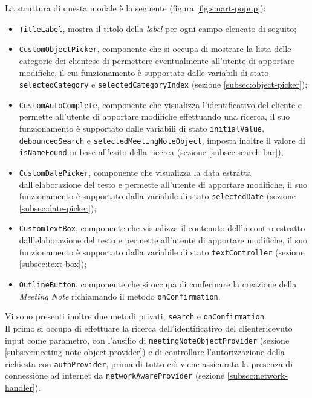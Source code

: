 La struttura di questa modale è la seguente (figura \ref{fig:smart-popup}):
\begin{itemize}
    \item \lstinline{TitleLabel}, mostra il titolo della \emph{label} per ogni campo elencato di seguito;
    \item \lstinline{CustomObjectPicker}, componente che si occupa di mostrare la lista delle categorie dei \glspl{cliente}\glsoccur e di permettere eventualmente all'utente di apportare modifiche, il cui funzionamento è supportato dalle variabili di stato \lstinline{selectedCategory} e \lstinline{selectedCategoryIndex} (sezione \ref{subsec:object-picker});
    \item \lstinline{CustomAutoComplete}, componente che visualizza l'identificativo del cliente e permette all'utente di apportare modifiche effettuando una ricerca, il suo funzionamento è supportato dalle variabili di stato \lstinline{initialValue}, \lstinline{debouncedSearch} e \lstinline{selectedMeetingNoteObject}, imposta inoltre il valore di \lstinline{isNameFound} in base all'esito della ricerca (sezione \ref{subsec:search-bar});
    \item \lstinline{CustomDatePicker}, componente che visualizza la data estratta dall'elaborazione del testo e permette all'utente di apportare modifiche, il suo funzionamento è supportato dalla variabile di stato \lstinline{selectedDate} (sezione \ref{subsec:date-picker});
    \item \lstinline{CustomTextBox}, componente che visualizza il contenuto dell'incontro estratto dall'elaborazione del testo e permette all'utente di apportare modifiche, il suo funzionamento è supportato dalla variabile di stato \lstinline{textController} (sezione \ref{subsec:text-box});
    \item \lstinline{OutlineButton}\cite{site:outline-button}, componente che si occupa di confermare la creazione della \emph{Meeting Note} richiamando il metodo \lstinline{onConfirmation}.
\end{itemize}
Vi sono presenti inoltre due metodi privati, \lstinline{search} e \lstinline{onConfirmation}. \\
Il primo si occupa di effettuare la ricerca dell'identificativo del \gls{cliente}\glsoccur ricevuto input come parametro, con l'ausilio di \lstinline{meetingNoteObjectProvider} (sezione \ref{subsec:meeting-note-object-provider}) e di controllare l'autorizzazione della richiesta con \lstinline{authProvider}, prima di tutto ciò viene assicurata la presenza di connessione ad internet da \lstinline{networkAwareProvider} (sezione \ref{subsec:network-handler}). \\
